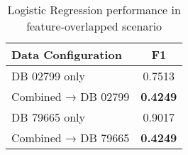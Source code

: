 \begin{table}[ht]
  \centering
  \caption{Logistic Regression performance in feature-overlapped scenario}
  \label{tab:logistic_regression_feature_overlap}
  \begin{tabular}{lc}
  \toprule
  \textbf{Data Configuration} & \textbf{F1} \\
  \midrule
  DB 02799 only & 0.7513 \\
  Combined → DB 02799 & \textbf{0.4249} \\
  \midrule
  DB 79665 only & 0.9017 \\
  Combined → DB 79665 & \textbf{0.4249} \\
  \bottomrule
  \end{tabular}
\end{table}